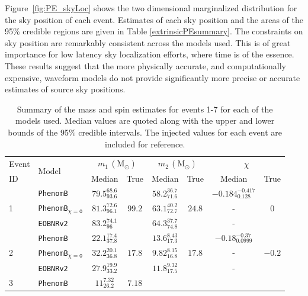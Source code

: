 \documentclass[12pt]{iopart}
\newcommand{\eob}{\texttt{EOBNRv2}\xspace}
\newcommand{\imr}{\texttt{PhenomB}\xspace}
\newcommand{\imrns}{\texttt{PhenomB$_\mathtt{\chi=0}$}\xspace}
\begin{document}
Figure~\ref{fig:PE_skyLoc} shows the two dimensional marginalized distribution
for the sky position of each event.  Estimates of each sky position and the
areas of the 95\% credible regions are given in Table \ref{extrinsicPEsummary}.
The constraints on sky position are remarkably consistent across the models
used.  This is of great importance for low latency sky localization efforts,
where time is of the essence.  These results suggest that the more physically
accurate, and computationally expensive, waveform models do not provide
significantly more precise or accurate estimates of source sky positions.

\begin{table}
  \caption{\label{intrinsicPEsummary}
      Summary of the mass and spin estimates for events 1-7 for each of the 
models used.  Median values are
      quoted along with the upper and lower bounds of the 95\% credible 
intervals.  The injected values for each
      event are included for reference.}
  \begin{tabular}{|l|l||c|c||c|c||c|c||}
    \hline Event & \multirow{2}{*}{Model} 
&\multicolumn{2}{c||}{$m_1\,(\mathrm{M}_\odot)$} & 
\multicolumn{2}{c||}{$m_2\,(\mathrm{M}_\odot)$} & \multicolumn{2}{c||}{$\chi$} 
\\
    \cline{3-8} 
 ID & & Median & True & Median & True & Median & True \\
    \hline \hline
  \multirow{3}{*}{1} & \imr & $79.5^{68.6}_{93.6}$ & \multirow{3}{*}{$99.2$} & 
$58.2^{36.7}_{71.6}$ & \multirow{3}{*}{$24.8$} & $-0.184^{-0.417}_{0.128}$ & 
\multirow{3}{*}{$0$} \\
    \cline{2-2}\cline{3-3} \cline{5-5} \cline{7-7}
& \imrns & $81.3^{72.6}_{96.1}$ & & $63.1^{40.2}_{72.7}$ & & - & \\
    \cline{2-2}\cline{3-3} \cline{5-5} \cline{7-7}
& \eob & $83.2^{74.1}_{96}$ & & $64.3^{37.7}_{74.8}$ & & - & \\
    \hline \hline
  \multirow{3}{*}{2} & \imr & $22.1^{17.4}_{37.8}$ & \multirow{3}{*}{$17.8$} & 
$13.6^{8.43}_{17.3}$ & \multirow{3}{*}{$17.8$} & $-0.18^{-0.37}_{0.0999}$ & 
\multirow{3}{*}{$-0.2$} \\
    \cline{2-2}\cline{3-3} \cline{5-5} \cline{7-7}
& \imrns & $32.2^{20.1}_{36.8}$ & & $9.82^{8.15}_{16.8}$ & & - & \\
    \cline{2-2}\cline{3-3} \cline{5-5} \cline{7-7}
& \eob & $27.9^{19.9}_{33.2}$ & & $11.8^{9.32}_{17.5}$ & & - & \\
    \hline \hline
  \multirow{3}{*}{3} & \imr & $11^{7.32}_{26.2}$ & \multirow{3}{*}{$7.18$} & 

\end{tabular}
\end{table}
\end{document}
